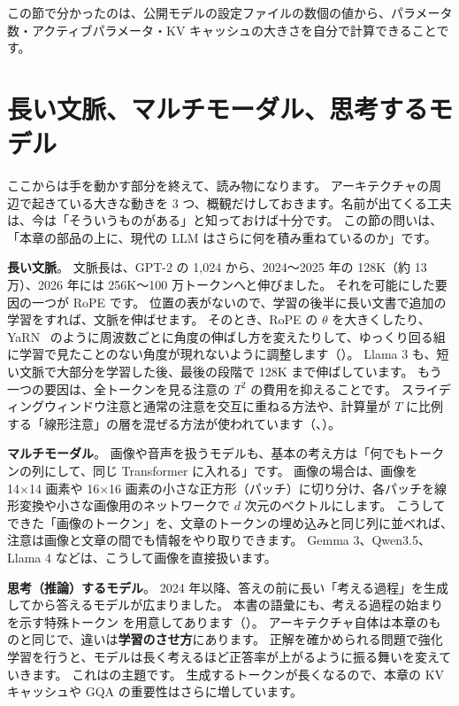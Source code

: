 この節で分かったのは、公開モデルの設定ファイルの数個の値から、パラメータ数・アクティブパラメータ・KV キャッシュの大きさを自分で計算できることです。

\section{長い文脈、マルチモーダル、思考するモデル}\label{sec:ma-beyond}

ここからは手を動かす部分を終えて、読み物になります。
アーキテクチャの周辺で起きている大きな動きを 3 つ、概観だけしておきます。名前が出てくる工夫は、今は「そういうものがある」と知っておけば十分です。
この節の問いは、「本章の部品の上に、現代の LLM はさらに何を積み重ねているのか」です。

\textbf{長い文脈}。
文脈長は、GPT-2 の 1,024 から、2024〜2025 年の 128K（約 13 万）、2026 年には 256K〜100 万トークンへと伸びました。
それを可能にした要因の一つが RoPE です。
位置の表がないので、学習の後半に長い文書で追加の学習をすれば、文脈を伸ばせます。
そのとき、RoPE の $\theta$ を大きくしたり、YaRN~\cite{peng2024yarn} のように周波数ごとに角度の伸ばし方を変えたりして、ゆっくり回る組に学習で見たことのない角度が現れないように調整します（）。
Llama 3 も、短い文脈で大部分を学習した後、最後の段階で 128K まで伸ばしています\cite{dubey2024llama3}。
もう一つの要因は、全トークンを見る注意の $T^2$ の費用を抑えることです。
スライディングウィンドウ注意と通常の注意を交互に重ねる方法や、計算量が $T$ に比例する「線形注意」の層を混ぜる方法が使われています（、）。

\textbf{マルチモーダル}。
画像や音声を扱うモデルも、基本の考え方は「何でもトークンの列にして、同じ Transformer に入れる」です。
画像の場合は、画像を 14×14 画素や 16×16 画素の小さな正方形（パッチ）に切り分け、各パッチを線形変換や小さな画像用のネットワークで $d$ 次元のベクトルにします。
こうしてできた「画像のトークン」を、文章のトークンの埋め込みと同じ列に並べれば、注意は画像と文章の間でも情報をやり取りできます。
Gemma 3、Qwen3.5、Llama 4 などは、こうして画像を直接扱います。

\textbf{思考（推論）するモデル}。
2024 年以降、答えの前に長い「考える過程」を生成してから答えるモデルが広まりました。
本書の語彙にも、考える過程の始まりを示す特殊トークン  を用意してあります（）。
アーキテクチャ自体は本章のものと同じで、違いは\textbf{学習のさせ方}にあります。
正解を確かめられる問題で強化学習を行うと、モデルは長く考えるほど正答率が上がるように振る舞いを変えていきます\cite{guo2025deepseekr1}。
これはの主題です。
生成するトークンが長くなるので、本章の KV キャッシュや GQA の重要性はさらに増しています。


